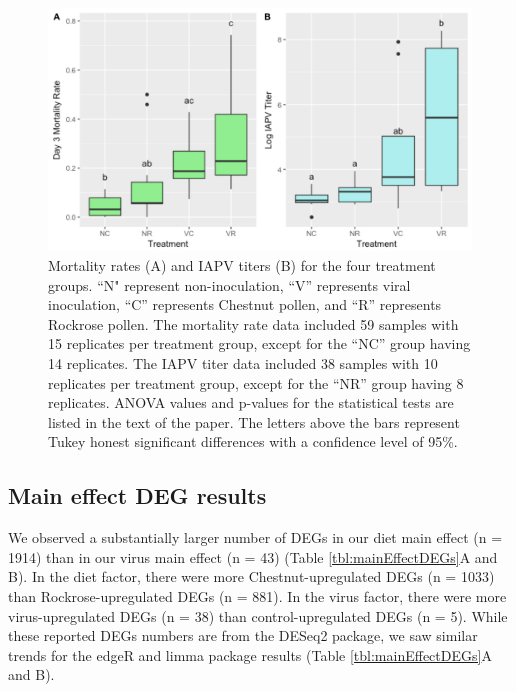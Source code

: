 \documentclass[11pt,a4paper,oldfontcommands,openany]{memoir}
\numberwithin{equation}{section} %
\begin{document}
\begin{figure}[H]
\centering
  \begin{framed}
  \includegraphics[width=\textwidth]{Images/mortality}
  \end{framed}
  \caption{Mortality rates (A) and IAPV titers (B) for the four treatment groups. ``N" represent non-inoculation, ``V'' represents viral inoculation, ``C'' represents Chestnut pollen, and ``R'' represents Rockrose pollen. The mortality rate data included 59 samples with 15 replicates per treatment group, except for the ``NC'' group having 14 replicates. The IAPV titer data included 38 samples with 10 replicates per treatment group, except for the ``NR'' group having 8 replicates. ANOVA values and p-values for the statistical tests are listed in the text of the paper. The letters above the bars represent Tukey honest significant differences with a confidence level of 95\%.}
  \label{fig:mortality}
\end{figure}

\subsection{Main effect DEG results}

We observed a substantially larger number of DEGs in our diet main effect (n = 1914) than in our virus main effect (n = 43) (Table \ref{tbl:mainEffectDEGs}A and B). In the diet factor, there were more Chestnut-upregulated DEGs (n = 1033) than Rockrose-upregulated DEGs (n = 881). In the virus factor, there were more virus-upregulated DEGs (n = 38) than control-upregulated DEGs (n = 5). While these reported DEGs numbers are from the DESeq2 package, we saw similar trends for the edgeR and limma package results (Table \ref{tbl:mainEffectDEGs}A and B).
\end{document}
